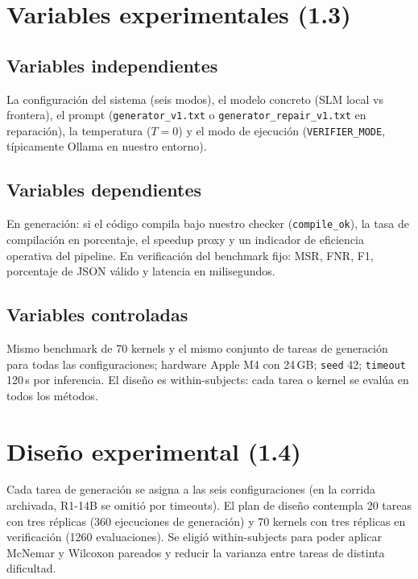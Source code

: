\section{Variables experimentales (1.3)}

\subsection{Variables independientes}

La configuración del sistema (seis modos), el modelo concreto (SLM local vs frontera), el prompt (\texttt{generator\_v1.txt} o \texttt{generator\_repair\_v1.txt} en reparación), la temperatura ($T = 0$) y el modo de ejecución (\texttt{VERIFIER\_MODE}, típicamente Ollama en nuestro entorno).

\subsection{Variables dependientes}

En generación: si el código compila bajo nuestro checker (\texttt{compile\_ok}), la tasa de compilación en porcentaje, el speedup proxy y un indicador de eficiencia operativa del pipeline. En verificación del benchmark fijo: MSR, FNR, F1, porcentaje de JSON válido y latencia en milisegundos.

\subsection{Variables controladas}

Mismo benchmark de 70 kernels y el mismo conjunto de tareas de generación para todas las configuraciones; hardware Apple M4 con 24\,GB; \texttt{seed} 42; \texttt{timeout} 120\,s por inferencia. El diseño es within-subjects: cada tarea o kernel se evalúa en todos los métodos.

\section{Diseño experimental (1.4)}

Cada tarea de generación se asigna a las seis configuraciones (en la corrida archivada, R1-14B se omitió por timeouts). El plan de diseño contempla 20 tareas con tres réplicas (360 ejecuciones de generación) y 70 kernels con tres réplicas en verificación (1260 evaluaciones). Se eligió within-subjects para poder aplicar McNemar y Wilcoxon pareados y reducir la varianza entre tareas de distinta dificultad.

